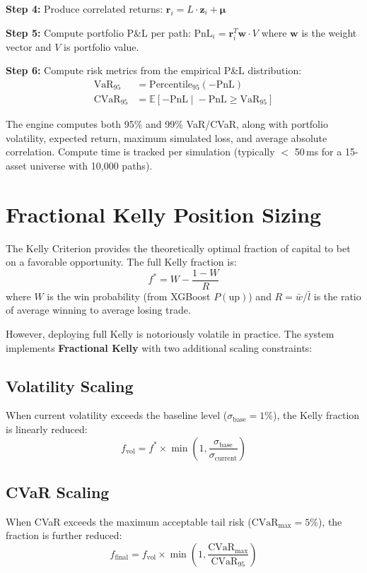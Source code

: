 \documentclass[letterpaper,11pt]{report}
\begin{document}
\textbf{Step 4:} Produce correlated returns: $\mathbf{r}_i = L \cdot \mathbf{z}_i + \boldsymbol{\mu}$

\textbf{Step 5:} Compute portfolio P\&L per path: $\text{PnL}_i = \mathbf{r}_i^T \mathbf{w} \cdot V$ where $\mathbf{w}$ is the weight vector and $V$ is portfolio value.

\textbf{Step 6:} Compute risk metrics from the empirical P\&L distribution:
\begin{align}
\text{VaR}_{95} &= \text{Percentile}_{95}(-\text{PnL}) \\
\text{CVaR}_{95} &= \mathbb{E}[-\text{PnL} \;|\; -\text{PnL} \geq \text{VaR}_{95}]
\end{align}

The engine computes both 95\% and 99\% VaR/CVaR, along with portfolio volatility, expected return, maximum simulated loss, and average absolute correlation. Compute time is tracked per simulation (typically $<$ 50\,ms for a 15-asset universe with 10,000 paths).

\section{Fractional Kelly Position Sizing}

The Kelly Criterion provides the theoretically optimal fraction of capital to bet on a favorable opportunity. The full Kelly fraction is:
$$f^* = W - \frac{1-W}{R}$$
where $W$ is the win probability (from XGBoost $P(\text{up})$) and $R = \bar{w}/\bar{l}$ is the ratio of average winning to average losing trade.

However, deploying full Kelly is notoriously volatile in practice. The system implements \textbf{Fractional Kelly} with two additional scaling constraints:

\subsection{Volatility Scaling}

When current volatility exceeds the baseline level ($\sigma_{\text{base}} = 1\%$), the Kelly fraction is linearly reduced:
$$f_{\text{vol}} = f^* \times \min\left(1, \frac{\sigma_{\text{base}}}{\sigma_{\text{current}}}\right)$$

\subsection{CVaR Scaling}

When CVaR exceeds the maximum acceptable tail risk ($\text{CVaR}_{\max} = 5\%$), the fraction is further reduced:
$$f_{\text{final}} = f_{\text{vol}} \times \min\left(1, \frac{\text{CVaR}_{\max}}{\text{CVaR}_{95}}\right)$$
\end{document}

